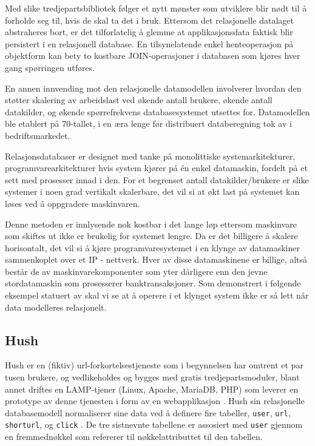 Med slike tredjepartsbibliotek følger et nytt mønster som utviklere blir nødt til å forholde seg til, hvis de skal ta det i bruk. Ettersom det relasjonelle datalaget abstraheres bort, er det tilforlatelig å glemme at applikasjonsdata faktisk blir persistert i en relasjonell database. En tilsynelatende enkel henteoperasjon på objektform kan bety to kostbare JOIN-operasjoner i databasen som kjøres hver gang spørringen utføres.

En annen innvending mot den relasjonelle datamodellen involverer hvordan den støtter skalering av arbeidslast ved økende antall brukere, økende antall datakilder, og økende spørrefrekvens databasesystemet utsettes for. Datamodellen ble etablert på 70-tallet, i en æra lenge før distribuert databeregning tok av i bedriftsmarkedet.

Relasjonsdatabaser er designet med tanke på monolittiske systemarkitekturer, programvarearkitekturer hvis system kjører på én enkel datamaskin, fordelt på et sett med prosesser innad i den. For et begrenset antall datakilder/brukere er slike systemer i noen grad vertikalt skalerbare, det vil si at økt last på systemet kan løses ved å oppgradere maskinvaren.

Denne metoden er innlysende nok kostbar i det lange løp ettersom maskinvare som skiftes ut ikke er brukelig for systemet lengre. Da er det billigere å skalere horisontalt, det vil si å kjøre programvaresystemet i en klynge av datamaskiner sammenkoplet over et IP - nettverk. Hver av disse datamaskinene er billige, altså består de av maskinvarekomponenter som yter dårligere enn den jevne stordatamaskin som prosesserer banktransaksjoner. Som demonstrert i følgende eksempel statuert av \cite{george2011} skal vi se at å operere i et klynget system ikke er så lett når data modelleres relasjonelt.

\subsection{Hush}

Hush er en (fiktiv) url-forkortelsestjeneste som i begynnelsen har omtrent et par tusen brukere, og vedlikeholdes og bygges med gratis tredjepartsmoduler, blant annet driftes en LAMP-tjener (Linux, Apache, MariaDB, PHP) som leverer en prototype av denne tjenesten i form av en webapplikasjon \citep{george2011}. Hush sin relasjonelle databasemodell normaliserer sine data ved å definere fire tabeller, \texttt{user}, \texttt{url}, \texttt{shorturl}, og \texttt{click} \citep{george2011}. De tre sistnevnte tabellene er assosiert med \texttt{user} gjennom en fremmednøkkel som refererer til nøkkelattributtet til den tabellen.

